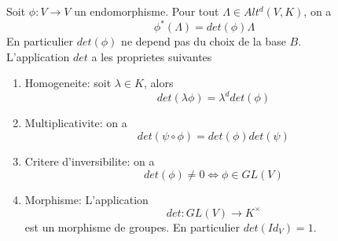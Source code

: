 \documentclass[../main.tex]{subfiles}
\begin{document}
\begin{thm}
	Soit $\phi:V \to V$ un endomorphisme. Pour tout $\Lambda\in Alt^{d}( V,K)$, on a
	\[ 
		\phi^{*}( \Lambda) = det( \phi) \Lambda
	\]
	En particulier $det( \phi) $ ne depend pas du choix de la base $B$.\\
	L'application $det$ a les proprietes suivantes
	\begin{enumerate}
	\item Homogeneite: soit $\lambda\in K$, alors
		\[ 
			det( \lambda\phi) = \lambda^{d}det( \phi) 
		\]
		
	\item Multiplicativite: on a
		\[ 
			det( \psi\circ\phi) = det( \phi) det( \psi) 
		\]
		
	\item Critere d'inversibilite: on a
		\[ 
			det( \phi) \neq 0 \iff \phi \in GL( V) 	
		\]
		
	\item Morphisme: L'application 
		\[ 
			det: GL( V)  \to K^{\times}
		\]
		est un morphisme de groupes. En particulier $det( Id_V) =1$.
	\end{enumerate}
	
\end{thm}
\end{document}
